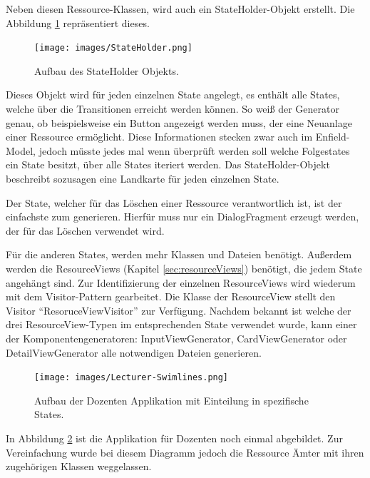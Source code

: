 Neben diesen Ressource-Klassen, wird auch ein StateHolder-Objekt erstellt. Die Abbildung \ref{fig:stateHolder} repräsentiert dieses. 

\begin{figure}[H]
	\begin{center}
		\texttt{[image: images/StateHolder.png]}
		\caption{Aufbau des StateHolder Objekts.}
		\label{fig:stateHolder}
	\end{center}
\end{figure}

Dieses Objekt wird für jeden einzelnen State angelegt, es enthält alle States, welche über die Transitionen erreicht werden können.
So weiß der Generator genau, ob beispielsweise ein Button angezeigt werden muss, der eine Neuanlage einer Ressource ermöglicht. Diese Informationen stecken zwar auch im Enfield-Model, jedoch müsste jedes mal wenn überprüft werden soll welche Folgestates ein State besitzt, über alle States iteriert werden. Das StateHolder-Objekt beschreibt sozusagen eine Landkarte für jeden einzelnen State.

Der State, welcher für das Löschen einer Ressource verantwortlich ist, ist der einfachste zum generieren. Hierfür muss nur ein DialogFragment erzeugt werden, der für das Löschen verwendet wird. 

Für die anderen States, werden mehr Klassen und Dateien benötigt. Außerdem werden die ResourceViews (Kapitel \ref{sec:resourceViews}) benötigt, die jedem State angehängt sind. Zur Identifizierung der einzelnen ResourceViews wird wiederum mit dem Visitor-Pattern gearbeitet. Die Klasse der ResourceView stellt den Visitor \enquote{ResoruceViewVisitor} zur Verfügung. 
Nachdem bekannt ist welche der drei ResourceView-Typen im entsprechenden State verwendet wurde, kann einer der Komponentengeneratoren: InputViewGenerator, CardViewGenerator oder DetailViewGenerator alle notwendigen Dateien generieren.

\begin{figure}[H]
	\begin{center}
		\texttt{[image: images/Lecturer-Swimlines.png]}
		\caption{Aufbau der Dozenten Applikation mit Einteilung in spezifische States.}
		\label{fig:swimlines}
	\end{center}
\end{figure}

In Abbildung \ref{fig:swimlines} ist die Applikation für Dozenten noch einmal abgebildet. Zur Vereinfachung wurde bei diesem Diagramm jedoch die Ressource Ämter mit ihren zugehörigen Klassen weggelassen.

